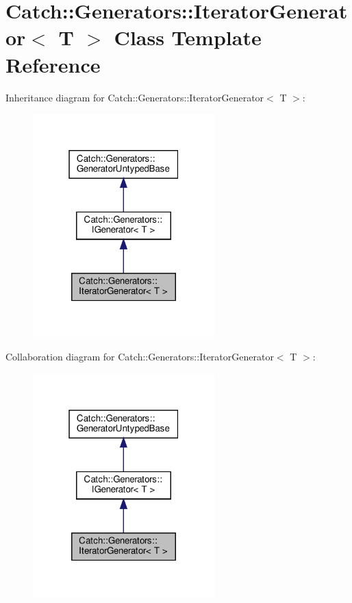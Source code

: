 \hypertarget{classCatch_1_1Generators_1_1IteratorGenerator}{}\section{Catch\+:\+:Generators\+:\+:Iterator\+Generator$<$ T $>$ Class Template Reference}
\label{classCatch_1_1Generators_1_1IteratorGenerator}


Inheritance diagram for Catch\+:\+:Generators\+:\+:Iterator\+Generator$<$ T $>$\+:
\nopagebreak
\begin{figure}[H]
\begin{center}
\leavevmode
\includegraphics[width=199pt]{classCatch_1_1Generators_1_1IteratorGenerator__inherit__graph}
\end{center}
\end{figure}


Collaboration diagram for Catch\+:\+:Generators\+:\+:Iterator\+Generator$<$ T $>$\+:
\nopagebreak
\begin{figure}[H]
\begin{center}
\leavevmode
\includegraphics[width=199pt]{classCatch_1_1Generators_1_1IteratorGenerator__coll__graph}
\end{center}
\end{figure}
